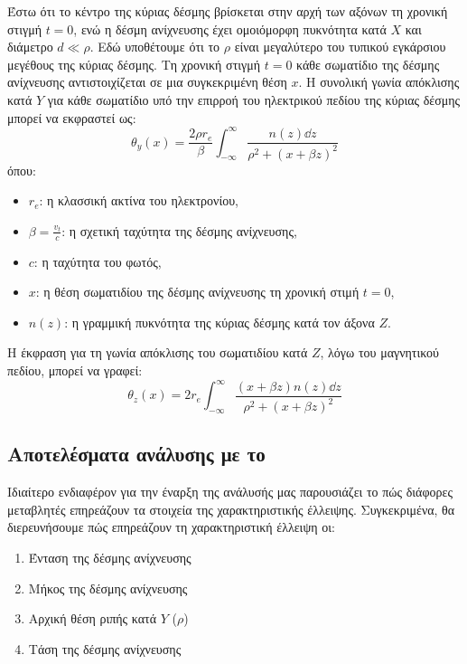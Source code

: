 Έστω ότι το κέντρο της κύριας δέσμης βρίσκεται στην αρχή των αξόνων τη χρονική στιγμή $t = 0$, ενώ η δέσμη ανίχνευσης έχει ομοιόμορφη πυκνότητα κατά $X$ και διάμετρο $d \ll \rho$.
Εδώ υποθέτουμε ότι το $\rho$ είναι μεγαλύτερο του τυπικού εγκάρσιου μεγέθους της κύριας δέσμης.
Τη χρονική στιγμή $t=0$ κάθε  σωματίδιο της δέσμης ανίχνευσης αντιστοιχίζεται σε μια συγκεκριμένη θέση $x$.
Η συνολική γωνία απόκλισης κατά $Y$ για κάθε σωματίδιο υπό την επιρροή του ηλεκτρικού πεδίου της κύριας δέσμης μπορεί να εκφραστεί ως\cite{Logatchov1999}:
\begin{equation}
\theta_y (x) = \frac{2 \rho r_e}{\beta} \int_{-\infty}^{\infty}\frac{n(z) \dd z}{\rho^2 + \left(x+\beta z \right) ^2}
\end{equation}
όπου:
\begin{itemize}
\item $r_e$: η κλασσική ακτίνα του ηλεκτρονίου,
\item $\beta =\frac{v_t}{c}$: η σχετική ταχύτητα της δέσμης ανίχνευσης,
\item $c$: η ταχύτητα του φωτός,
\item $x$: η θέση σωματιδίου της δέσμης ανίχνευσης τη χρονική στιμή $t=0$,
\item $n(z)$: η γραμμική πυκνότητα της κύριας δέσμης κατά τον άξονα $Z$.
\end{itemize} 

Η έκφραση για τη γωνία απόκλισης του σωματιδίου κατά $Z$, λόγω του μαγνητικού πεδίου, μπορεί να γραφεί\cite{Logatchov1999}:
\begin{equation}
\theta_z(x) = 2 r_e \int_{-\infty}^{\infty}\frac{(x+\beta z)n(z) \dd z}{\rho^2 + \left(x+\beta z \right) ^2}
\end{equation}
\subsection{Αποτελέσματα ανάλυσης με το }
Ιδιαίτερο ενδιαφέρον για την έναρξη της ανάλυσής μας παρουσιάζει το πώς διάφορες μεταβλητές επηρεάζουν τα στοιχεία της χαρακτηριστικής έλλειψης. 
Συγκεκριμένα, θα διερευνήσουμε πώς επηρεάζουν τη χαρακτηριστική έλλειψη οι:
\begin{enumerate}
	\item Ένταση της δέσμης ανίχνευσης
	\item Μήκος της δέσμης ανίχνευσης
	\item Αρχική θέση ριπής κατά $Y$ ($\rho$) 
	\item Τάση της δέσμης ανίχνευσης
\end{enumerate}

